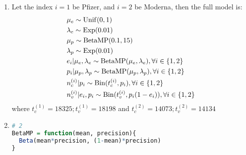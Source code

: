 \documentclass{article}
\begin{document}



\begin{enumerate}
\item
Let the index $i = 1$ be Pfizer, and $i = 2$ be Moderna, then the full model is:
\begin{align*}
& \mu_e \sim \operatorname{Unif}(0,1)\\
& \lambda_e \sim \operatorname{Exp}(0.01)\\
& \mu_p \sim \operatorname{BetaMP}(0.1, 15)\\
& \lambda_p \sim \operatorname{Exp}(0.01)\\
& e_i|\mu_e, \lambda_e \sim \operatorname{BetaMP}(\mu_e, \lambda_e), \forall i \in \{1, 2\}\\
& p_i|\mu_p, \lambda_p \sim \operatorname{BetaMP}(\mu_p, \lambda_p), \forall i \in \{1, 2\}\\
& n_c^{(i)}|p_i \sim \operatorname{Bin}(t_c^{(i)}, p_i), \forall i \in \{1, 2\}\\
& n_v^{(i)}|e_i, p_i \sim \operatorname{Bin}(t_v^{(i)}, p_i(1-e_i)), \forall i \in \{1, 2\}
\end{align*}
where $t_c^{(1)} = 18325; t_v^{(1)} = 18198$ and $t_c^{(2)} = 14073; t_v^{(2)} = 14134$


\item 
\begin{lstlisting}[language=R]
# 2
BetaMP = function(mean, precision){
  Beta(mean*precision, (1-mean)*precision)
}


\end{lstlisting}
\end{enumerate}
\end{document}

